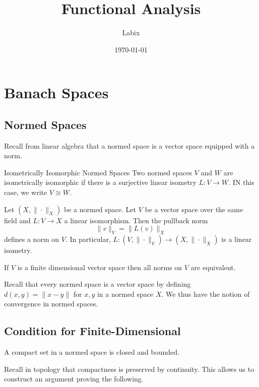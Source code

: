 \documentclass[a4paper]{article}
\title{Functional Analysis}
\author{Labix}
\date{\today}
\begin{document}
\maketitle
\begin{abstract}
\end{abstract}
\tableofcontents
\pagebreak

\section{Banach Spaces}
\subsection{Normed Spaces}
Recall from linear algebra that a normed space is a vector space equipped with a norm. 

\begin{defn}{Isometrically Isomorphic Normed Spaces}{} Two normed spaces $V$ and $W$ are isometrically isomorphic if there is a surjective linear isometry $L:V\to W$. IN this case, we write $V\cong W$. 
\end{defn}

\begin{prp}{}{} Let $(X,\|\cdot\|_X)$ be a normed space. Let $V$ be a vector space over the same field and $L:V\to X$ a linear isomorphism. Then the pullback norm $$\|v\|_V=\|L(v)\|_X$$ defines a norm on $V$.  In particular, $L:(V,\|\cdot\|_V)\to(X,\|\cdot\|_X)$ is a linear isometry. 
\end{prp}

\begin{thm}{}{} If $V$ is a finite dimensional vector space then all norms on $V$ are equivalent. 
\end{thm}

Recall that every normed space is a vector space by defining $d(x,y)=\|x-y\|$ for $x,y$ in a normed space $X$. We thus have the notion of convergence in normed spaces. 

\subsection{Condition for Finite-Dimensional}
\begin{thm}{}{} A compact set in a normed space is closed and bounded. 
\end{thm}

Recall in topology that compactness is preserved by continuity. This allows us to construct an argument proving the following. 
\end{document}
